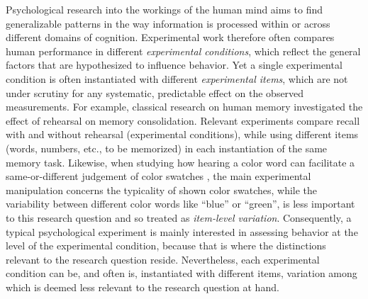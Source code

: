 \documentclass[fleqn]{article}
\begin{document}
Psychological research into the workings of the human mind aims to find generalizable patterns in the way information is processed within or across different domains of cognition.
Experimental work therefore often compares human performance in different \emph{experimental conditions}, which reflect the general factors that are hypothesized to influence behavior.
Yet a single experimental condition is often instantiated with different \emph{experimental items}, which are not under scrutiny for any systematic, predictable effect on the observed measurements.
For example, classical research on human memory \citep{AtkinsonShiffrin1968:Human-memory:-A} investigated the effect of rehearsal on memory consolidation.
Relevant experiments compare recall with and without rehearsal (experimental conditions), while using different items (words, numbers, etc., to be memorized) in each instantiation of the same memory task.
Likewise, when studying how hearing a color word can facilitate a same-or-different judgement of color swatches \citep{Rosch1975:The-Nature-of-M}, the main experimental manipulation concerns the typicality of shown color swatches, while the variability between different color words like ``blue'' or ``green'', is less important to this research question and so treated as \emph{item-level variation}.
Consequently, a typical psychological experiment is mainly interested in assessing behavior at the level of the experimental condition, because that is where the distinctions relevant to the research question reside.
Nevertheless, each experimental condition can be, and often is, instantiated with different items, variation among which is deemed less relevant to the research question at hand.
\end{document}
